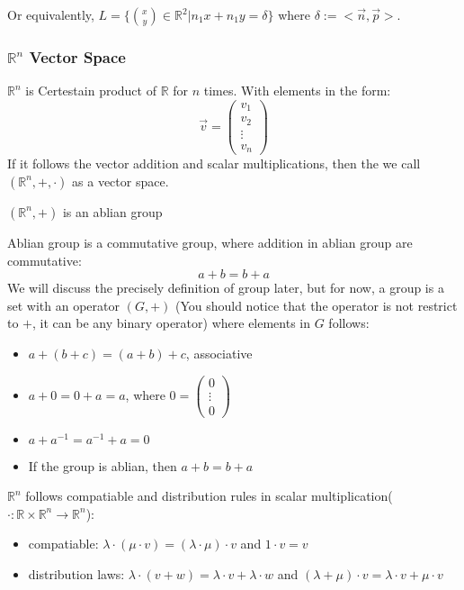 \documentclass{article}
\newcommand{\R}{\mathbb{R}}
\begin{document}
Or equivalently, $L=\{ {x\choose y}\in \R^2 |n_1x+n_1y=\delta    \}$ where $\delta:=<\vec{n},\vec{p}>$.









\subsubsection{$\R^n$ Vector Space}
\begin{definition}
	$\R^n$ is Certestain product of $\R$ for $n$ times. With elements in the form:
	\begin{equation*}
		\vec{v}=\begin{pmatrix}
  v_1 \\
  v_2 \\
  \vdots \\
  v_n
\end{pmatrix}
	\end{equation*}
	If it follows the vector addition and scalar multiplications, then the we call $(\R^n,+,\cdot)$ as a vector space.
\end{definition}

\begin{remark}
	$(\R^n,+)$ is an ablian group
\end{remark}

Ablian group is a commutative group, where addition in ablian group are commutative:
\begin{equation*}
	a+b=b+a
\end{equation*}
We will discuss the precisely definition of group later, but for now, a group is a set with an operator $(G,+)$ (You should notice that the operator is not restrict to $+$, it can be any binary operator) where elements in $G$ follows:
\begin{itemize}
	\item $a+(b+c)=(a+b)+c$, associative
	\item $a+0=0+a=a$, where $0=\begin{pmatrix}
  0 \\
  \vdots \\
  0
\end{pmatrix}$
	\item $a+a^{-1}=a^{-1}+a=0$
	\item If the group is ablian, then $a+b=b+a$
\end{itemize}

\begin{remark}
	$\R^n$ follows compatiable and distribution rules in scalar multiplication($\cdot:\R\times\R^n\to \R^n$):
	\begin{itemize}
		\item compatiable: $\lambda\cdot(\mu \cdot v)=(\lambda\cdot \mu)\cdot v$ and $1\cdot v=v$
		\item distribution laws: $\lambda \cdot (v+w)=\lambda\cdot v+\lambda\cdot w$ and $(\lambda+\mu)\cdot v=\lambda\cdot v+\mu\cdot v$
	\end{itemize}
\end{remark}
\end{document}
